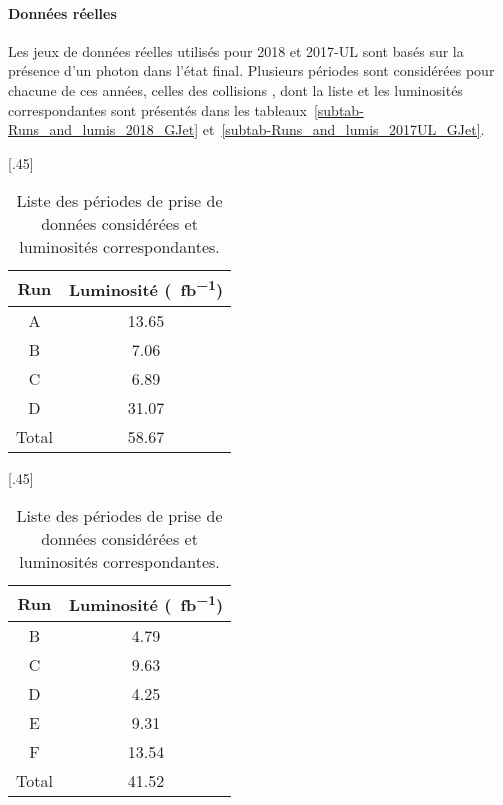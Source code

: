 \paragraph{Données réelles}
Les jeux de données réelles utilisés pour 2018 et 2017-UL sont basés sur la présence d'un photon dans l'état final.
Plusieurs périodes sont considérées pour chacune de ces années, celles des collisions \proton\proton, dont la liste et les luminosités correspondantes sont présentés dans les tableaux~\ref{subtab-Runs_and_lumis_2018_GJet} et~\ref{subtab-Runs_and_lumis_2017UL_GJet}.
\begin{table}[h]
\centering
{}[.45\textwidth]
{\begin{tabular}{cc}
\toprule
Run & Luminosité (\SI{}{\femto\barn^{-1}})\\
\midrule
A & \num{13.65} \\
B & \num{7.06} \\
C & \num{6.89} \\
D & \num{31.07} \\
\midrule
Total & \num{58.67} \\
\bottomrule
\end{tabular}}
[.45\textwidth]
{\begin{tabular}{cc}
\toprule
Run & Luminosité (\SI{}{\femto\barn^{-1}})\\
\midrule
B & \num{4.79} \\
C & \num{9.63} \\
D & \num{4.25} \\
E & \num{9.31} \\
F & \num{13.54} \\
\midrule
Total & \num{41.52} \\
\bottomrule
\end{tabular}}
\caption{Liste des périodes de prise de données considérées et luminosités correspondantes.}
\label{tab-Runs_and_lumis_2018_and_2017UL_GJet}
\end{table}
